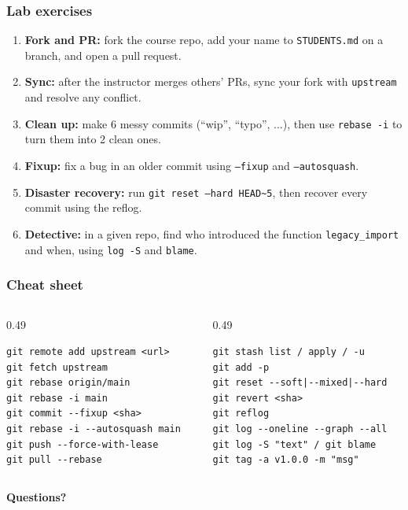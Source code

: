 \documentclass[aspectratio=169,10pt,compress]{beamer}
\newcommand{\cmd}[1]{\texttt{\color{gitred}#1}}
\begin{document}
\begin{frame}[t,fragile] \frametitle{Lab exercises}
  \begin{enumerate}
    \item \textbf{Fork and PR:} fork the course repo, add your name to
          \texttt{STUDENTS.md} on a branch, and open a pull request.
    \item \textbf{Sync:} after the instructor merges others' PRs, sync your fork
          with \texttt{upstream} and resolve any conflict.
    \item \textbf{Clean up:} make 6 messy commits (``wip'', ``typo'', ...),
          then use \cmd{rebase -i} to turn them into 2 clean ones.
    \item \textbf{Fixup:} fix a bug in an older commit using
          \cmd{--fixup} and \cmd{--autosquash}.
    \item \textbf{Disaster recovery:} run \cmd{git reset --hard HEAD\textasciitilde5},
          then recover every commit using the reflog.
    \item \textbf{Detective:} in a given repo, find who introduced the function
          \texttt{legacy\_import} and when, using \cmd{log -S} and \cmd{blame}.
  \end{enumerate}
\end{frame}

\begin{frame}[t,fragile] \frametitle{Cheat sheet}
  \begin{columns}[T]
    \begin{column}{0.49\textwidth}
\begin{lstlisting}
git remote add upstream <url>
git fetch upstream
git rebase origin/main
git rebase -i main
git commit --fixup <sha>
git rebase -i --autosquash main
git push --force-with-lease
git pull --rebase
\end{lstlisting}
    \end{column}
    \begin{column}{0.49\textwidth}
\begin{lstlisting}
git stash list / apply / -u
git add -p
git reset --soft|--mixed|--hard
git revert <sha>
git reflog
git log --oneline --graph --all
git log -S "text" / git blame
git tag -a v1.0.0 -m "msg"
\end{lstlisting}
    \end{column}
  \end{columns}

  \vspace{1em}
  \begin{center}
    {\Large \textbf{Questions?}}
  \end{center}
\end{frame}
\end{document}

